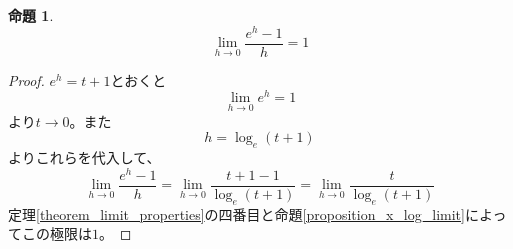 \documentclass{ltjsarticle}
\newtheorem{proposition}{命題}[section]
\begin{document}
\begin{proposition}

\begin{equation*}
\lim_{h\to0}{\frac {e^h-1} h} = 1
\end{equation*}
\end{proposition}
\begin{proof}
$e^h = t+1$とおくと
\begin{equation*}
\lim_{h\to0}e^h = 1
\end{equation*}
より$t\to0$。また
\begin{equation*}
h = \log_e(t+1)
\end{equation*}
よりこれらを代入して、
\begin{equation*}
\lim_{h\to0}{\frac {e^h-1} h}  = \lim_{h\to0}{\frac {t+1-1} {\log_e(t+1)}} = \lim_{h\to0}{\frac {t} {\log_e(t+1)}} 
\end{equation*}
定理\ref{theorem_limit_properties}の四番目と命題\ref{proposition_x_log_limit}によってこの極限は$1$。
\end{proof}
\end{document}
